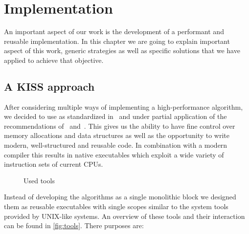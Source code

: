 \chapter{Implementation}
\label{ch:implementation}

An important aspect of our work is the development of a performant and reusable implementation. In this chapter we are going to explain important aspect of this work, generic strategies as well as specific solutions that we have applied to achieve that objective.



\section{A KISS approach}
\label{sec:implementation:approach}

After considering multiple ways of implementing a high-performance algorithm, we decided to use  as standardized in~\cite{cpp14} and under partial application of the recommendations of~\cite{effective_cpp} and~\cite{effective_cpp2}. This gives us the ability to have fine control over memory allocations and data structures as well as the opportunity to write modern, well-structured and reusable code. In combination with a modern compiler this results in native executables which exploit a wide variety of instruction sets of current CPUs.

\begin{sidewaysfigure}
    \centering
    
    \caption{Used tools}\label{fig:tools}
\end{sidewaysfigure}

Instead of developing the algorithms as a single monolithic block we designed them as reusable executables with single scopes similar to the system tools provided by UNIX-like systems. An overview of these tools and their interaction can be found in \autoref{fig:tools}. There purposes are:

